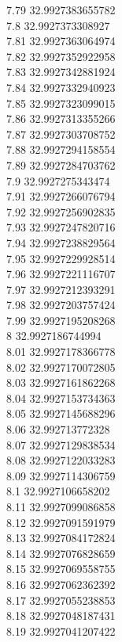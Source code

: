 {7.79	32.9927383655782\\
7.8	32.9927373308927\\
7.81	32.9927363064974\\
7.82	32.9927352922958\\
7.83	32.9927342881924\\
7.84	32.9927332940923\\
7.85	32.9927323099015\\
7.86	32.9927313355266\\
7.87	32.9927303708752\\
7.88	32.9927294158554\\
7.89	32.9927284703762\\
7.9	32.9927275343474\\
7.91	32.9927266076794\\
7.92	32.9927256902835\\
7.93	32.9927247820716\\
7.94	32.9927238829564\\
7.95	32.9927229928514\\
7.96	32.9927221116707\\
7.97	32.9927212393291\\
7.98	32.9927203757424\\
7.99	32.9927195208268\\
8	32.9927186744994\\
8.01	32.9927178366778\\
8.02	32.9927170072805\\
8.03	32.9927161862268\\
8.04	32.9927153734363\\
8.05	32.9927145688296\\
8.06	32.992713772328\\
8.07	32.9927129838534\\
8.08	32.9927122033283\\
8.09	32.9927114306759\\
8.1	32.9927106658202\\
8.11	32.9927099086858\\
8.12	32.9927091591979\\
8.13	32.9927084172824\\
8.14	32.9927076828659\\
8.15	32.9927069558755\\
8.16	32.9927062362392\\
8.17	32.9927055238853\\
8.18	32.9927048187431\\
8.19	32.9927041207422\\
}
